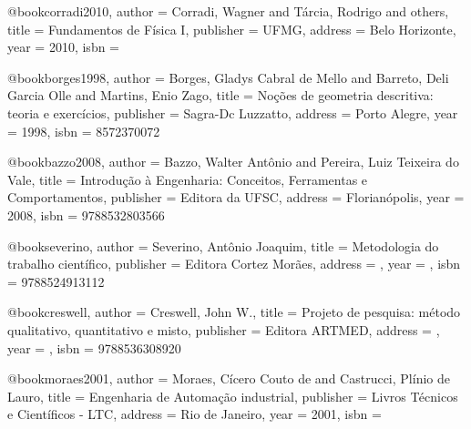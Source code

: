 @book{corradi2010,
  author = {Corradi, Wagner and Tárcia, Rodrigo and others},
  title = {Fundamentos de Física I},
  publisher = {UFMG},
  address = {Belo Horizonte},
  year = {2010},
  isbn = {}
}

%

@book{borges1998,
  author = {Borges, Gladys Cabral de Mello and Barreto, Deli Garcia Olle and Martins, Enio Zago},
  title = {Noções de geometria descritiva: teoria e exercícios},
  publisher = {Sagra-Dc Luzzatto},
  address = {Porto Alegre},
  year = {1998},
  isbn = {8572370072}
}

%

@book{bazzo2008,
  author = {Bazzo, Walter Antônio and Pereira, Luiz Teixeira do Vale},
  title = {Introdução à Engenharia: Conceitos, Ferramentas e Comportamentos},
  publisher = {Editora da UFSC},
  address = {Florianópolis},
  year = {2008},
  isbn = {9788532803566}
}

@book{severino,
  author = {Severino, Antônio Joaquim},
  title = {Metodologia do trabalho científico},
  publisher = {Editora Cortez Morães},
  address = {},
  year = {},
  isbn = {9788524913112}
}

@book{creswell,
  author = {Creswell, John W.},
  title = {Projeto de pesquisa: método qualitativo, quantitativo e misto},
  publisher = {Editora ARTMED},
  address = {},
  year = {},
  isbn = {9788536308920}
}

@book{moraes2001,
  author = {Moraes, Cícero Couto de and Castrucci, Plínio de Lauro},
  title = {Engenharia de Automação industrial},
  publisher = {Livros Técnicos e Científicos - LTC},
  address = {Rio de Janeiro},
  year = {2001},
  isbn = {}
}

